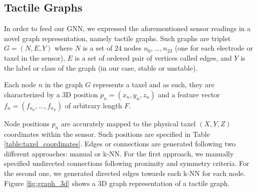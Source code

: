 \subsection{Tactile Graphs}
\label{cha:tactile:sec:tactilegcn:subsec:tactile-graphs}

In order to feed our \acl{GNN}, we expressed the aforementioned sensor readings in a novel graph representation, namely tactile graphs. Such graphs are triplet $G = (N, E, Y)$ where $N$ is a set of $24$ nodes ${n_0, ..., n_{23}}$ (one for each electrode or taxel in the sensor), $E$ is a set of ordered pair of vertices called edges, and $Y$ is the label or class of the graph (in our case, stable or unstable).

Each node $n$ in the graph $G$ represents a taxel and as such, they are characterized by a \acs{3D} position $p_n = (x_n, y_n, z_n)$ and a feature vector $f_n = (f_{n_0}, ..., f_{n_F})$ of arbitrary length $F$.

Node positions $p_n$ are accurately mapped to the physical taxel $(X, Y, Z)$ coordinates within the sensor. Such positions are specified in Table \ref{table:taxel_coordinates}. Edges or connections are generated following two different approaches: manual or \ac{k-NN}. For the first approach, we manually specified undirected connections following proximity and symmetry criteria. For the second one, we generated directed edges towards each \acl{k-NN} for each node. Figure \ref{fig:graph_3d} shows a \acs{3D} graph representation of a tactile graph.

